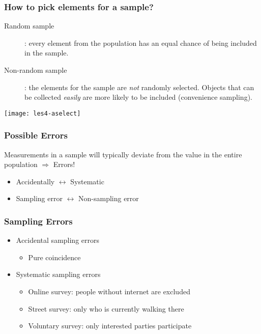 \documentclass[aspectratio=169]{beamer}
\begin{document}
\begin{frame}
  \frametitle{How to pick elements for a sample?}
  
  \begin{description}
    \item[Random sample]: every element from the population has an equal chance of being included in the sample.
    \item[Non-random sample]: the elements for the sample are \textit{not} randomly selected.
    Objects that can be collected \textit{easily} are more likely to be included (convenience sampling).
  \end{description}
  
  \begin{center}
    \texttt{[image: les4-aselect]}
  \end{center}
\end{frame}

\begin{frame}
  \frametitle{Possible Errors}
  
  Measurements in a sample will typically deviate from the value in the entire population $\Rightarrow$ Errors!
  
  \bigskip
  
  \begin{itemize}
    \item Accidentally $\leftrightarrow$ Systematic
    \item Sampling error $\leftrightarrow$ Non-sampling error
  \end{itemize}
\end{frame}

\begin{frame}
  \frametitle{Sampling Errors}
  
  \begin{itemize}
    \item<+-> Accidental sampling errors
    \begin{itemize}
      \item Pure coincidence
    \end{itemize}
    \item<+-> Systematic sampling errors
    \begin{itemize}
      \item Online survey: people without internet are excluded
      \item Street survey: only who is currently walking there
      \item Voluntary survey: only interested parties participate
    \end{itemize}
  \end{itemize}
\end{frame}
\end{document}
